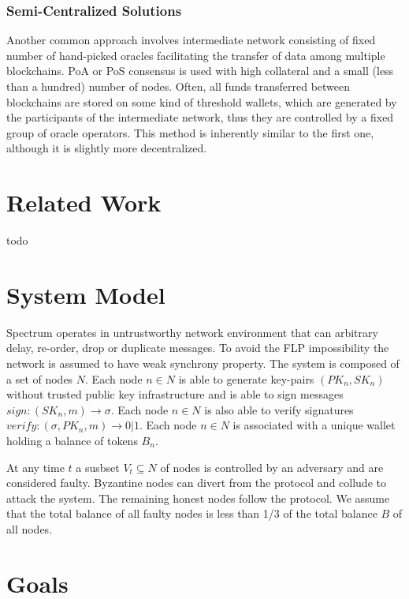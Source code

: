 \documentclass{article}
\begin{document}
    \subsubsection{Semi-Centralized Solutions}\label{subsubsec:semi-centralized-solutions}

    Another common approach involves intermediate network consisting of fixed number of hand-picked oracles facilitating the transfer of data among multiple blockchains.
    PoA or PoS consensus is used with high collateral and a small (less than a hundred) number of nodes.
    Often, all funds transferred between blockchains are stored on some kind of threshold wallets, which are generated by the participants of the intermediate network, thus they are controlled by a fixed group of oracle operators.
    This method is inherently similar to the first one, although it is slightly more decentralized.


    \section{Related Work}\label{sec:related-work}

    todo


    \section{System Model}\label{sec:system-model}

    Spectrum operates in untrustworthy network environment that can arbitrary delay, re-order, drop or duplicate messages.
    To avoid the FLP impossibility the network is assumed to have weak synchrony property.
    The system is composed of a set of nodes $N$.
    Each node $n \in N$ is able to generate key-pairs $(PK_n, SK_n)$ without trusted public key infrastructure and is able to sign messages $sign: (SK_n, m) \rightarrow \sigma$.
    Each node $n \in N$ is also able to verify signatures $verify: (\sigma, PK_n, m) \rightarrow 0 | 1$.
    Each node $n \in N$ is associated with a unique wallet holding a balance of tokens $B_n$.

    At any time $t$ a susbset $V_t \subseteq N$ of nodes is controlled by an adversary and are considered faulty.
    Byzantine nodes can divert from the protocol and collude to attack the system.
    The remaining honest nodes follow the protocol.
    We assume that the total balance of all faulty nodes is less than 1/3 of the total balance $B$ of all nodes.


    \section{Goals}\label{sec:goals}
\end{document}
